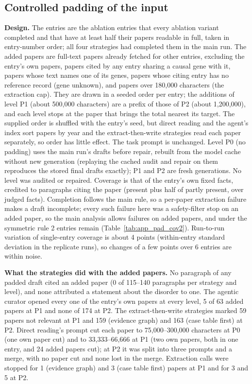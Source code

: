\documentclass{article} %
\begin{document}
\FloatBarrier
\subsection{Controlled padding of the input}
\label{app:r2_pad}
\textbf{Design.} The entries are the ablation entries that every ablation variant completed and that have at least half their papers readable in full, taken in entry-number order; all four strategies had completed them in the main run. The added papers are full-text papers already fetched for other entries, excluding the entry's own papers, papers cited by any entry sharing a causal gene with it, papers whose text names one of its genes, papers whose citing entry has no reference record (gene unknown), and papers over 180,000 characters (the extraction cap). They are drawn in a seeded order per entry; the additions of level P1 (about 500,000 characters) are a prefix of those of P2 (about 1,200,000), and each level stops at the paper that brings the total nearest its target. The supplied order is shuffled with the entry's seed, but direct reading and the agent's index sort papers by year and the extract-then-write strategies read each paper separately, so order has little effect. The task prompt is unchanged. Level P0 (no padding) uses the main run's drafts before repair, rebuilt from the model cache without new generation (replaying the cached audit and repair on them reproduces the stored final drafts exactly); P1 and P2 are fresh generations. No level was audited or repaired. Coverage is that of the entry's own fixed facts, credited to paragraphs citing the paper (present plus half of partly present, over judged facts). Completion follows the main rule, so a per-paper extraction failure makes a draft incomplete; every such failure here was a safety-filter stop on an added paper, so the main analysis allows failures on added papers, and under the symmetric rule 2 entries remain (Table~\ref{tab:app_pad_cov2}). Run-to-run variation of single-entry coverage is about 4 points (within-entry standard deviation in the replicate runs), so changes of a few points over 6 entries are within noise.

\textbf{What the strategies did with the added papers.} No paragraph of any padded draft cited an added paper (0 of 115--140 paragraphs per strategy and level), and none attributed a statement about the disorder to one. The agentic curator opened every one of the entry's own papers at every level, 5 of 63 added papers at P1 and none of 174 at P2. The extract-then-write strategies marked 59 papers not relevant at P1 and 159 (evidence graph) and 163 (case table first) at P2. Direct reading's prompt cut each paper to 75,000--300,000 characters at P0 (one own paper cut) and to 33,333--66,666 at P1 (two own papers, both in one entry, and 24 added papers cut); at P2 it was split into three prompts and a merge, with no paper cut and none lost in the merge. Extraction calls were stopped for 1 (evidence graph) and 3 (case table first) papers at P1 and for 3 and 5 at P2.
\end{document}
